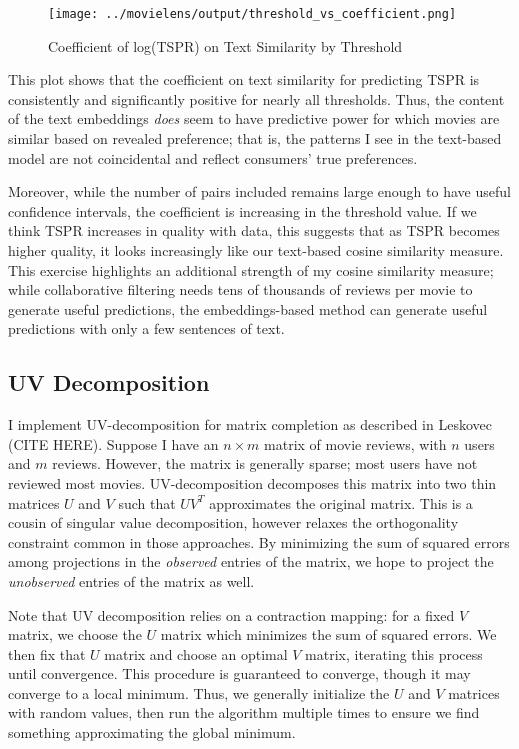 \documentclass{article}
\begin{document}
\begin{figure}
    \begin{center}
    \texttt{[image: ../movielens/output/threshold\_vs\_coefficient.png]}
    \caption{Coefficient of log(TSPR) on Text Similarity by Threshold}
    \label{fig:tspr_threshold}
    \end{center}
\end{figure}

This plot shows that the coefficient on text similarity for predicting TSPR is consistently and significantly positive for nearly all thresholds. Thus, the content of the text embeddings \emph{does} seem to have predictive power for which movies are similar based on revealed preference; that is, the patterns I see in the text-based model are not coincidental and reflect consumers' true preferences. 

Moreover, while the number of pairs included remains large enough to have useful confidence intervals, the coefficient is increasing in the threshold value. If we think TSPR increases in quality with data, this suggests that as TSPR becomes higher quality, it looks increasingly like our text-based cosine similarity measure. This exercise highlights an additional strength of my cosine similarity measure; while collaborative filtering needs tens of thousands of reviews per movie to generate useful predictions, the embeddings-based method can generate useful predictions with only a few sentences of text.

\subsection{UV Decomposition}

I implement UV-decomposition for matrix completion as described in Leskovec (CITE HERE). Suppose I have an $n \times m$ matrix of movie reviews, with $n$ users and $m$ reviews. However, the matrix is generally sparse; most users have not reviewed most movies. UV-decomposition decomposes this matrix into two thin matrices $U$ and $V$ such that $UV^T$ approximates the original matrix. This is a cousin of singular value decomposition, however relaxes the orthogonality constraint common in those approaches. By minimizing the sum of squared errors among projections in the \emph{observed} entries of the matrix, we hope to project the \emph{unobserved} entries of the matrix as well.

Note that UV decomposition relies on a contraction mapping: for a fixed $V$ matrix, we choose the $U$ matrix which minimizes the sum of squared errors. We then fix that $U$ matrix and choose an optimal $V$ matrix, iterating this process until convergence. This procedure is guaranteed to converge, though it may converge to a local minimum. Thus, we generally initialize the $U$ and $V$ matrices with random values, then run the algorithm multiple times to ensure we find something approximating the global minimum. 
\end{document}
